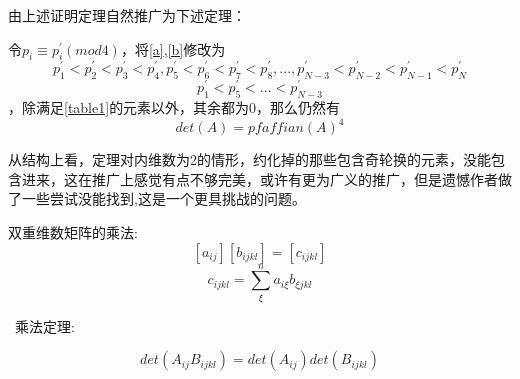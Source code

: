 \documentclass{amsc}          %
\numberwithin{equation}{section} %
\begin{document}
由上述证明定理自然推广为下述定理：

\begin{theorem}
令$p_{i}\equiv p^{'}_{i} (mod 4)$，将\ref{a},\ref{b}修改为
\begin{equation}\label{aa}p^{'}_{1}<p^{'}_{2}<p^{'}_{3}<p^{'}_{4},p^{'}_{5}<p^{'}_{6}<p^{'}_{7}<p^{'}_{8}
   ,...,p^{'}_{N-3}<p^{'}_{N-2}<p^{'}_{N-1}<p^{'}_{N}\end{equation}
\begin{equation}\label{bb}p^{'}_{1}<p^{'}_{5}<...<p^{'}_{N-3}\end{equation}，除满足\ref{table1}的元素以外，其余都为0，那么仍然有$$det(A)=pfaffian(A)^{4}$$
\end{theorem}


从结构上看，定理对内维数为2的情形，约化掉的那些包含奇轮换的元素，没能包含进来，这在推广上感觉有点不够完美，或许有更为广义的推广，但是遗憾作者做了一些尝试没能找到,这是一个更具挑战的问题。


\begin{definition}  双重维数矩阵的乘法:
   $$[a_{ij}][b_{ijkl}]=[c_{ijkl}]$$
   $$c_{ijkl} = \sum_{\xi}^{n}a_{i\xi}b_{\xi jkl}$$
\end{definition}

\begin{theorem}\   乘法定理:

    $$det(A_{ij}B_{ijkl})=det(A_{ij})det(B_{ijkl})$$
\end{theorem}
\end{document}
